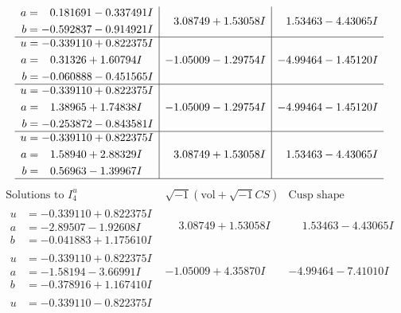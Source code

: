 \documentclass[1p]{elsarticle_modified}
\theoremstyle{definition}
\newcommand{\I}{\sqrt{-1}}
\begin{document}
$$\begin{array}{c|c|c}
\begin{aligned}
a &= \phantom{-}0.181691 - 0.337491 I \\
b &= -0.592837 - 0.914921 I\end{aligned}
 & \phantom{-}3.08749 + 1.53058 I & \phantom{-}1.53463 - 4.43065 I \\ \hline\begin{aligned}
u &= -0.339110 + 0.822375 I \\
a &= \phantom{-}0.31326 + 1.60794 I \\
b &= -0.060888 - 0.451565 I\end{aligned}
 & -1.05009 - 1.29754 I & -4.99464 - 1.45120 I \\ \hline\begin{aligned}
u &= -0.339110 + 0.822375 I \\
a &= \phantom{-}1.38965 + 1.74838 I \\
b &= -0.253872 - 0.843581 I\end{aligned}
 & -1.05009 - 1.29754 I & -4.99464 - 1.45120 I \\ \hline\begin{aligned}
u &= -0.339110 + 0.822375 I \\
a &= \phantom{-}1.58940 + 2.88329 I \\
b &= \phantom{-}0.56963 - 1.39967 I\end{aligned}
 & \phantom{-}3.08749 + 1.53058 I & \phantom{-}1.53463 - 4.43065 I\\
 \hline 
 \end{array}$$\newpage$$\begin{array}{c|c|c}  
\text{Solutions to }I^u_{4}& \I (\text{vol} + \sqrt{-1}CS) & \text{Cusp shape}\\
 \hline 
\begin{aligned}
u &= -0.339110 + 0.822375 I \\
a &= -2.89507 - 1.92608 I \\
b &= -0.041883 + 1.175610 I\end{aligned}
 & \phantom{-}3.08749 + 1.53058 I & \phantom{-}1.53463 - 4.43065 I \\ \hline\begin{aligned}
u &= -0.339110 + 0.822375 I \\
a &= -1.58194 - 3.66991 I \\
b &= -0.378916 + 1.167410 I\end{aligned}
 & -1.05009 + 4.35870 I & -4.99464 - 7.41010 I \\ \hline\begin{aligned}
u &= -0.339110 - 0.822375 I \\

\end{aligned}
\end{array}$$
\end{document}
